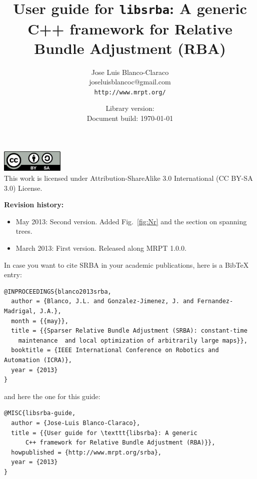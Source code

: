 \documentclass[a4paper,11pt]{article}
\title{User guide for \texttt{libsrba}: A generic C++ framework for Relative Bundle Adjustment (RBA)}
\author{Jose Luis Blanco-Claraco \\ joseluisblancoc@gmail.com \\ \texttt{http://www.mrpt.org/} }
\date{Library version: \SRBALIBVERSION \\ Document build: \today }
\begin{document}
\maketitle


\vfill

\begin{scriptsize}
\begin{center}
\includegraphics[width=3cm]{imgs/by-sa.pdf}
\\
This work is licensed under Attribution-ShareAlike 3.0 International (CC BY-SA 3.0) License.
\end{center}
\end{scriptsize}

\vspace{1cm}

\newpage

\textbf{Revision history:}
\begin{itemize}
 \item May 2013: Second version. Added Fig.~\ref{fig:Nr} and the section on spanning trees.
 \item March 2013: First version. Released along MRPT 1.0.0.
\end{itemize}

\vfill


\begin{small}
In case you want to cite SRBA in your academic publications, here is a BibTeX entry: 

\begin{verbatim}
@INPROCEEDINGS{blanco2013srba,
  author = {Blanco, J.L. and Gonzalez-Jimenez, J. and Fernandez-Madrigal, J.A.},
  month = {{may}},
  title = {{Sparser Relative Bundle Adjustment (SRBA): constant-time 
    maintenance  and local optimization of arbitrarily large maps}},
  booktitle = {IEEE International Conference on Robotics and Automation (ICRA)},
  year = {2013}
}
\end{verbatim} 

\noindent and here the one for this guide:

\begin{verbatim}
@MISC{libsrba-guide,
  author = {Jose-Luis Blanco-Claraco},
  title = {{User guide for \texttt{libsrba}: A generic 
      C++ framework for Relative Bundle Adjustment (RBA)}},
  howpublished = {http://www.mrpt.org/srba},
  year = {2013}
} 
\end{verbatim} 

\end{small}
\end{document}
